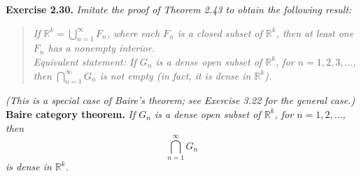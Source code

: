 \documentclass{article}
\begin{document}



\textbf{Exercise 2.30.}
\emph{Imitate the proof of Theorem 2.43 to obtain the following result:}
\begin{quote}
\emph{If $\mathbb{R}^k = \bigcup_{n=1}^{\infty} F_n$,
where each $F_n$ is a closed subset of $\mathbb{R}^k$,
then at least one $F_n$ has a nonempty interior.} \\

\emph{Equivalent statement: If $G_n$ is a dense open subset of $\mathbb{R}^k$,
for $n = 1,2,3,\ldots$, then $\bigcap_{n=1}^{\infty} G_n$ is not empty
(in fact, it is dense in $\mathbb{R}^k$).}
\end{quote}
\emph{(This is a special case of Baire's theorem; see Exercise 3.22 for the general case.)} \\

\textbf{Baire category theorem.}
\emph{
If $G_n$ is a dense open subset of $\mathbb{R}^k$,
for $n = 1,2,\ldots$, then $$\bigcap_{n=1}^{\infty} G_n$$
is dense in $\mathbb{R}^k$.} \\
\end{document}
